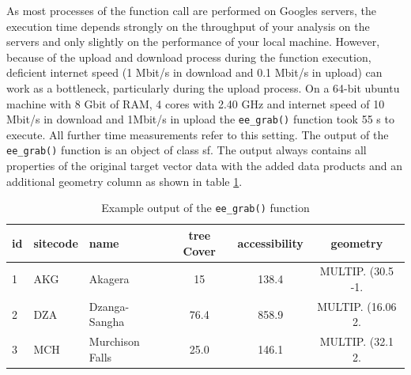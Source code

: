 As most processes of the function call are performed on Googles servers, the execution time depends strongly on the throughput of your analysis on the servers and only slightly on the performance of your local machine. However, because of the upload and download process during the function execution, deficient internet speed (1 Mbit/s in download and 0.1 Mbit/s in upload) can work as a bottleneck, particularly during the upload process. 
On a 64-bit ubuntu machine with 8 Gbit of RAM, 4 cores with 2.40 GHz and internet speed of 10 Mbit/s in download and 1Mbit/s in upload the \texttt{ee\_grab()} function took 55 s to execute. All further time measurements refer to this setting.
The output of the \texttt{ee\_grab()} function is an object of class sf.  The output always contains all properties of the original target vector data with the added data products and an additional geometry column as shown in table \ref{output}.

\begin{table}[h]
	\begin{tabularx}{\textwidth}{|l|l|l|c|c|c|}
		\hline
		id & sitecode & name & tree Cover & accessibility & geometry \\
		\hline
		1  & AKG  & Akagera & 15 & 138.4 & MULTIP. (30.5 -1.\\
		2 & DZA  & Dzanga-Sangha & 76.4 & 858.9 & MULTIP. (16.06 2.\\
		3 & MCH  & Murchison Falls & 25.0 & 146.1 & MULTIP. (32.1 2.\\
		
		\hline
	\end{tabularx}
	\caption{Example output of the \texttt{ee\_grab()} function}
	\label{output}
\end{table}


